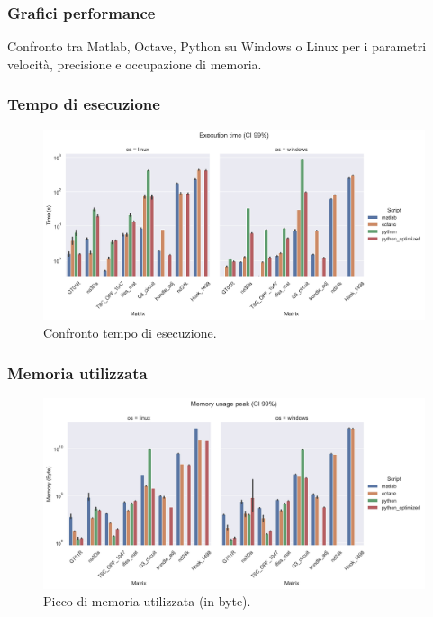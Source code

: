 \documentclass{beamer}
\begin{document}
\begin{frame}
\frametitle{Grafici performance}
Confronto tra Matlab,  Octave, Python su Windows o Linux per i parametri velocità, precisione e occupazione di memoria.
\end{frame}


\begin{frame}
	\frametitle{Tempo di esecuzione}
	\begin{figure}
		\includegraphics[width=1.35\textheight]{assets/execution.jpg}
		\caption{Confronto tempo di esecuzione.}
		\label{fig:execution}
	\end{figure}
\end{frame}

\begin{frame}
	\frametitle{Memoria utilizzata}
	\begin{figure}
		\includegraphics[width=1.35\textheight]{assets/memory.jpg}
		\caption{Picco di memoria utilizzata (in byte).}
		\label{fig:memory}
	\end{figure}
\end{frame}
\end{document}
